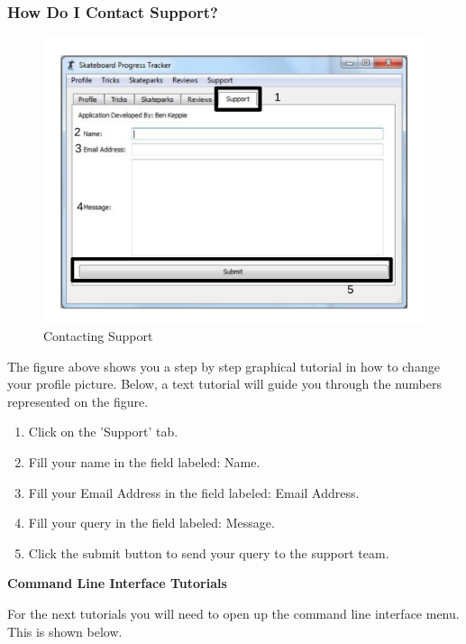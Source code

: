 \subsubsection{How Do I Contact Support?}

\begin{figure}[H]
    \includegraphics[width=\textwidth]{./Manual/Images/Support.pdf}
    \caption{Contacting Support} \label{fig:Support}
\end{figure}

The figure above shows you a step by step graphical tutorial in how to change your profile picture. Below, a text tutorial will guide you through the numbers represented on the figure.

\begin{enumerate}
\item Click on the 'Support' tab.
\item Fill your name in the field labeled: Name.
\item Fill your Email Address in the field labeled: Email Address.
\item Fill your query in the field labeled: Message.
\item Click the submit button to send your query to the support team.
\end{enumerate}


\textbf{Command Line Interface Tutorials}

For the next tutorials you will need to open up the command line interface menu. This is shown below.

